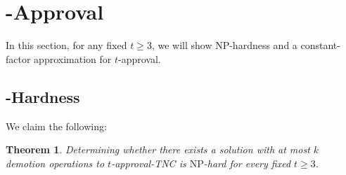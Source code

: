 \documentclass[letterpaper]{article} %
\newtheorem{theorem}{Theorem}
\newcommand{\SB}{\textsc{TNC}}
\newcommand{\NP}{\mathrm{NP}}
\begin{document}
\section{-Approval}
In this section, for any fixed $t \geq 3$, we will show $\NP$-hardness and a constant-factor approximation for $t$-approval.
\subsection{\boldmath{$\NP$}-Hardness}
We claim the following:
\begin{theorem}
Determining whether there exists a solution with at most $k$ demotion operations to $t$-approval-\SB{} is $\NP$-hard for every fixed $t \geq 3$.
\end{theorem}
\end{document}
